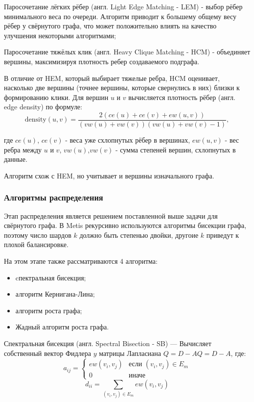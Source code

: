 Паросочетание лёгких рёбер (англ. Light Edge Matching - LEM) - выбор рёбер минимального веса по очереди. Алгоритм приводит к большему общему весу рёбер у свёрнутого графа, что может положительно влиять на качество улучшения некоторыми алгоритмами;

Паросочетание тяжёлых клик (англ. Heavy Clique Matching - HCM) - объединяет вершины, максимизируя плотность ребер создаваемого подграфа.

В отличие от HEM, который выбирает тяжелые ребра, HCM оценивает, насколько две вершины (точнее вершины, которые свернулись в них) близки к формированию клики. Для вершин $u$ и $v$ вычисляется плотность рёбер (англ. edge density) по формуле:
\begin{equation*}
    \text{density}(u,v) = \frac{2(ce(u) + ce(v) + ew(u,v))}{(vw(u) + vw(v))(vw(u) + vw(v) - 1)},
\end{equation*}

где $ce(u)$, $ce(v)$ - веса уже схлопнутых рёбер в вершинах, $ew(u,v)$ - вес ребра между $u$ и $v$, $vw(u)$,$ vw(v)$ - сумма степеней вершин, схлопнутых в данные.

Алгоритм схож с HEM, но учитывает и вершины изначального графа.

\subsubsection{Алгоритмы распределения} \label{section:KL1}
Этап распределения является решением поставленной выше задачи для свёрнутого графа. В Metis рекурсивно используются алгоритмы бисекции графа, поэтому число шардов $k$ должно быть степенью двойки, другоие $k$ приведут к плохой балансировке.

На этом этапе также рассматриваются 4 алгоритма:
\begin{itemize}
    \item cпектральная бисекция;
    \item алгоритм Кернигана-Лина;
    \item алгоритм роста графа;
    \item Жадный алгоритм роста графа.
\end{itemize}

Спектральная бисекция (англ. Spectral Bisection - SB) --- Вычисляет собственный вектор Фидлера $y$ матрицы Лапласиана $Q=D-AQ=D-A$, где:
\begin{equation*}
    a_{ij} = \begin{cases} 
ew(v_i, v_j) & \text{если } (v_i, v_j) \in E_m \\
0 & \text{иначе}
\end{cases}
\end{equation*}
\begin{equation*}
    d_{ii} = \sum_{(v_i, v_j) \in E_m} ew(v_i, v_j)
\end{equation*}

